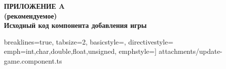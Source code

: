 \begin{center}
\textbf{
\MakeUppercase{Приложение A}\\
(рекомендуемое)\\
Исходный код компонента добавления игры}
\end{center}



 breaklines=true, tabsize=2, basicstyle=\small,
directivestyle={\color{black}}
emph={int,char,double,float,unsigned},
emphstyle={\color{blue}}]
{attachments/update-game.component.ts}
